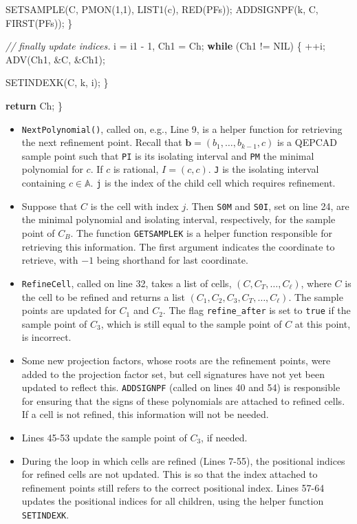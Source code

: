 \documentclass[
]{book}
\newenvironment{Shaded}{\begin{snugshade}}{\end{snugshade}}
\newcommand{\CommentTok}[1]{\textcolor[rgb]{0.56,0.35,0.01}{\textit{#1}}}
\newcommand{\ControlFlowTok}[1]{\textcolor[rgb]{0.13,0.29,0.53}{\textbf{#1}}}
\newcommand{\DecValTok}[1]{\textcolor[rgb]{0.00,0.00,0.81}{#1}}
\newcommand{\NormalTok}[1]{#1}
\providecommand{\tightlist}{%
  \setlength{\itemsep}{0pt}\setlength{\parskip}{0pt}}
\theoremstyle{definition}
\theoremstyle{definition}
\theoremstyle{definition}
\theoremstyle{definition}
\theoremstyle{remark}
\begin{document}
\begin{Shaded}
\begin{Highlighting}[numbers=left,,]
\NormalTok{        SETSAMPLE(C, PMON(}\DecValTok{1}\NormalTok{,}\DecValTok{1}\NormalTok{), LIST1(c), RED(PFs));}
\NormalTok{        ADDSIGNPF(k, C, FIRST(PFs));}
\NormalTok{    \}}

    \CommentTok{// finally update indices.}
\NormalTok{    i = i1 {-} }\DecValTok{1}\NormalTok{, Ch1 = Ch;}
    \ControlFlowTok{while}\NormalTok{ (Ch1 != NIL) \{}
\NormalTok{        ++i;}
\NormalTok{        ADV(Ch1, \&C, \&Ch1);}

\NormalTok{        SETINDEXK(C, k, i);}
\NormalTok{    \}}

    \ControlFlowTok{return}\NormalTok{ Ch;}
\NormalTok{\}}
\end{Highlighting}
\end{Shaded}

\begin{itemize}
\tightlist
\item
  \texttt{NextPolynomial()}, called on, e.g., Line 9, is a helper function for retrieving the next refinement point.
  Recall that \(\mathbf{b} = (b_1,\ldots,b_{k-1},c)\) is a QEPCAD sample point such that \texttt{PI} is its isolating interval and \texttt{PM} the minimal polynomial for \(c\). If \(c\) is rational, \(I = (c,c)\). \texttt{J} is the isolating interval containing \(c \in \mathbb{A}\). \texttt{j} is the index of the child cell which requires refinement.
\item
  Suppose that \(C\) is the cell with index \(j\). Then \texttt{S0M} and \texttt{S0I}, set on line 24, are the minimal polynomial and isolating interval, respectively, for the sample point of \(C_B\). The function \texttt{GETSAMPLEK} is a helper function responsible for retrieving this information. The first argument indicates the coordinate to retrieve, with \(-1\) being shorthand for last coordinate.
\item
  \texttt{RefineCell}, called on line 32, takes a list of cells, \((C,C_T, \ldots,C_\ell)\), where \(C\) is the cell to be refined and returns a list \((C_1,C_2,C_3,C_T,\ldots,C_\ell)\). The sample points are updated for \(C_1\) and \(C_2\). The flag \texttt{refine\_after} is set to \texttt{true} if the sample point of \(C_3\), which is still equal to the sample point of \(C\) at this point, is incorrect.
\item
  Some new projection factors, whose roots are the refinement points, were added to the projection factor set, but cell signatures have not yet been updated to reflect this. \texttt{ADDSIGNPF} (called on lines 40 and 54) is responsible for ensuring that the signs of these polynomials are attached to refined cells. If a cell is not refined, this information will not be needed.
\item
  Lines 45-53 update the sample point of \(C_3\), if needed.
\item
  During the loop in which cells are refined (Lines 7-55), the positional indices for refined cells are not updated. This is so that the index attached to refinement points still refers to the correct positional index. Lines 57-64 updates the positional indices for all children, using the helper function \texttt{SETINDEXK}.
\end{itemize}
\end{document}
